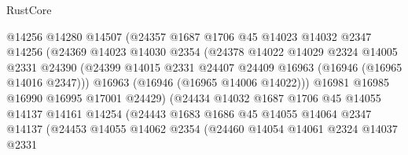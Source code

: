 \begin{lexlean}{RustCore}
\begin{coremodule}
                            @14256
                            @14280
                            @14507
                            (@24357
                              @1687
                              @1706
                              @45
                              @14023
                              @14032
                              @2347
                              @14256
                              (@24369
                                @14023
                                @14030
                                @2354
                                (@24378
                                  @14022
                                  @14029
                                  @2324
                                  @14005
                                  @2331
                                  @24390
                                  (@24399
                                    @14015
                                    @2331
                                    @24407
                                    @24409
                                    @16963
                                    (@16946 (@16965 @14016 @2347)))
                                  @16963
                                  (@16946 (@16965 @14006 @14022)))
                                @16981
                                @16985
                                @16990
                                @16995
                                @17001
                                @24429)
                              (@24434
                                @14032
                                @1687
                                @1706
                                @45
                                @14055
                                @14137
                                @14161
                                @14254
                                (@24443
                                  @1683
                                  @1686
                                  @45
                                  @14055
                                  @14064
                                  @2347
                                  @14137
                                  (@24453
                                    @14055
                                    @14062
                                    @2354
                                    (@24460
                                      @14054
                                      @14061
                                      @2324
                                      @14037
                                      @2331

\end{coremodule}
\end{lexlean}
